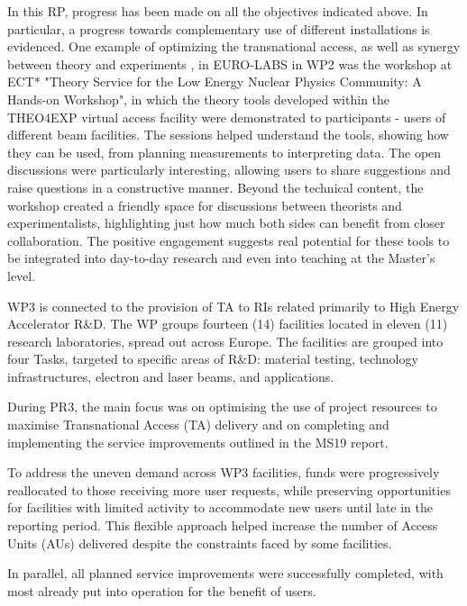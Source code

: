 In this RP, progress has been made on all the objectives indicated above.
In particular, a progress towards complementary use of different installations is evidenced. 
One example of  optimizing the  transnational access, as well as synergy between theory and experiments , in EURO-LABS in WP2 was the
workshop at ECT* "Theory Service for the Low Energy Nuclear Physics Community: A Hands-on Workshop", in which the theory tools developed within the THEO4EXP virtual access facility were demonstrated to participants - users of different beam facilities. The sessions helped understand the tools, showing how they can be used, from planning measurements to interpreting data. The open discussions were particularly interesting, allowing users to share suggestions and raise questions in a constructive manner. Beyond the technical content, the workshop created a friendly space for discussions between theorists and experimentalists, highlighting just how much both sides can benefit from closer collaboration. The positive engagement suggests real potential for these tools to be integrated into day-to-day research and even into teaching at the Master's level.  

 

WP3 is connected to the provision of TA to RIs related primarily to High Energy Accelerator R\&D. The WP groups fourteen (14) facilities located in eleven (11) research laboratories, spread out across Europe. The facilities are grouped into four Tasks, targeted to specific areas of R\&D: material testing, technology infrastructures, electron and laser beams, and applications. 

During PR3, the main focus was on optimising the use of project resources to maximise Transnational Access (TA) delivery and on completing and implementing the service improvements outlined in the MS19 report.

To address the uneven demand across WP3 facilities, funds were progressively reallocated to those receiving more user requests, while preserving opportunities for facilities with limited activity to accommodate new users until late in the reporting period. This flexible approach helped increase the number of Access Units (AUs) delivered despite the constraints faced by some facilities.

In parallel, all planned service improvements were successfully completed, with most already put into operation for the benefit of users.

